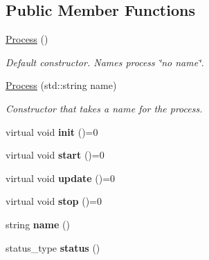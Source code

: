 \subsection*{Public Member Functions}
\begin{DoxyCompactItemize}
\item 
\mbox{\label{classelma_1_1_process_ae3b98871432794ea262f4a26dfeab3f7}} 
\mbox{\hyperlink{classelma_1_1_process_ae3b98871432794ea262f4a26dfeab3f7}{Process}} ()
\begin{DoxyCompactList}\small\item\em Default constructor. Names process \char`\"{}no name\char`\"{}. \end{DoxyCompactList}\item 
\mbox{\hyperlink{classelma_1_1_process_a4a29af963c350ce23ae8a91109affcf5}{Process}} (std\+::string name)
\begin{DoxyCompactList}\small\item\em Constructor that takes a name for the process. \end{DoxyCompactList}\item 
\mbox{\label{classelma_1_1_process_aeaf53c300dbde2444bf7a5948b70a9f6}} 
virtual void {\bfseries init} ()=0
\item 
\mbox{\label{classelma_1_1_process_ae3ffee069f55704617740bdc0142aecc}} 
virtual void {\bfseries start} ()=0
\item 
\mbox{\label{classelma_1_1_process_a9731a2218270c49af835c606c09bd6c5}} 
virtual void {\bfseries update} ()=0
\item 
\mbox{\label{classelma_1_1_process_a5aed57974a5acbe0d1f298584c91528e}} 
virtual void {\bfseries stop} ()=0
\item 
\mbox{\label{classelma_1_1_process_a7ce946a55e71578bc1d33cf0a826c0de}} 
string {\bfseries name} ()
\item 
\mbox{\label{classelma_1_1_process_ae43200bae94b94df1ec5cc10ff6b191b}} 
status\+\_\+type {\bfseries status} ()
\item 
\mbox{\label{classelma_1_1_process_ad210b775ce04da6d89fdc75435bab15f}} 

\end{DoxyCompactItemize}
